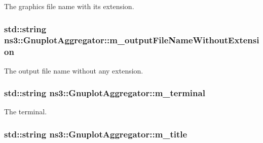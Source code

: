 The graphics file name with its extension. 

\subsubsection[{\texorpdfstring{m\+\_\+output\+File\+Name\+Without\+Extension}{m_outputFileNameWithoutExtension}}]{\setlength{\rightskip}{0pt plus 5cm}std\+::string ns3\+::\+Gnuplot\+Aggregator\+::m\+\_\+output\+File\+Name\+Without\+Extension\hspace{0.3cm}{\ttfamily [private]}}\hypertarget{classns3_1_1GnuplotAggregator_a3bfca1f816d054b5bb88438b9417c912}{}\label{classns3_1_1GnuplotAggregator_a3bfca1f816d054b5bb88438b9417c912}


The output file name without any extension. 

\subsubsection[{\texorpdfstring{m\+\_\+terminal}{m_terminal}}]{\setlength{\rightskip}{0pt plus 5cm}std\+::string ns3\+::\+Gnuplot\+Aggregator\+::m\+\_\+terminal\hspace{0.3cm}{\ttfamily [private]}}\hypertarget{classns3_1_1GnuplotAggregator_a658b78f6d45214fef0b2c3265585bab1}{}\label{classns3_1_1GnuplotAggregator_a658b78f6d45214fef0b2c3265585bab1}


The terminal. 

\subsubsection[{\texorpdfstring{m\+\_\+title}{m_title}}]{\setlength{\rightskip}{0pt plus 5cm}std\+::string ns3\+::\+Gnuplot\+Aggregator\+::m\+\_\+title\hspace{0.3cm}{\ttfamily [private]}}\hypertarget{classns3_1_1GnuplotAggregator_a00cf8d3633f1f62bda0be5b5f1fa1f93}{}\label{classns3_1_1GnuplotAggregator_a00cf8d3633f1f62bda0be5b5f1fa1f93}



